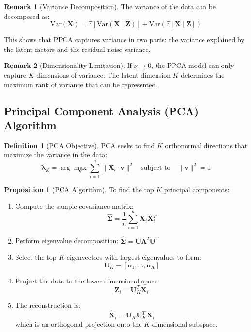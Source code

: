 \documentclass[12pt,a4paper]{article}
\theoremstyle{definition}
\newtheorem{definition}{Definition}[section]
\newtheorem{proposition}{Proposition}[section]
\newtheorem{remark}{Remark}[section]
\begin{document}
\begin{remark}[Variance Decomposition]
The variance of the data can be decomposed as:
\[
\text{Var}(\mathbf{X}) = \mathbb{E}[\text{Var}(\mathbf{X} \mid \mathbf{Z})] + \text{Var}(\mathbb{E}[\mathbf{X} \mid \mathbf{Z}])
\]

This shows that PPCA captures variance in two parts: the variance explained by the latent factors and the residual noise variance.
\end{remark}

\begin{remark}[Dimensionality Limitation]
If $\nu \to 0$, the PPCA model can only capture $K$ dimensions of variance. The latent dimension $K$ determines the maximum rank of variance that can be represented.
\end{remark}

\subsection{Principal Component Analysis (PCA) Algorithm}

\begin{definition}[PCA Objective]
PCA seeks to find $K$ orthonormal directions that maximize the variance in the data:
\[
\mathbf{\lambda}_K = \arg\max_{\mathbf{v}} \sum_{i=1}^n \|\mathbf{X}_i \cdot \mathbf{v}\|^2 \quad \text{subject to} \quad \|\mathbf{v}\|^2 = 1
\]
\end{definition}

\begin{proposition}[PCA Algorithm]
To find the top $K$ principal components:

\begin{enumerate}
    \item Compute the sample covariance matrix:
    \[
    \hat{\boldsymbol{\Sigma}} = \frac{1}{n} \sum_{i=1}^n \mathbf{X}_i \mathbf{X}_i^T
    \]
    
    \item Perform eigenvalue decomposition: $\hat{\boldsymbol{\Sigma}} = \mathbf{U} \mathbf{\Lambda}^2 \mathbf{U}^T$
    
    \item Select the top $K$ eigenvectors with largest eigenvalues to form:
    \[
    \mathbf{U}_K = [\mathbf{u}_1, \ldots, \mathbf{u}_K]
    \]
    
    \item Project the data to the lower-dimensional space:
    \[
    \mathbf{Z}_i = \mathbf{U}_K^T \mathbf{X}_i
    \]
    
    \item The reconstruction is:
    \[
    \hat{\mathbf{X}}_i = \mathbf{U}_K \mathbf{U}_K^T \mathbf{X}_i
    \]
    which is an orthogonal projection onto the $K$-dimensional subspace.
\end{enumerate}
\end{proposition}
\end{document}
